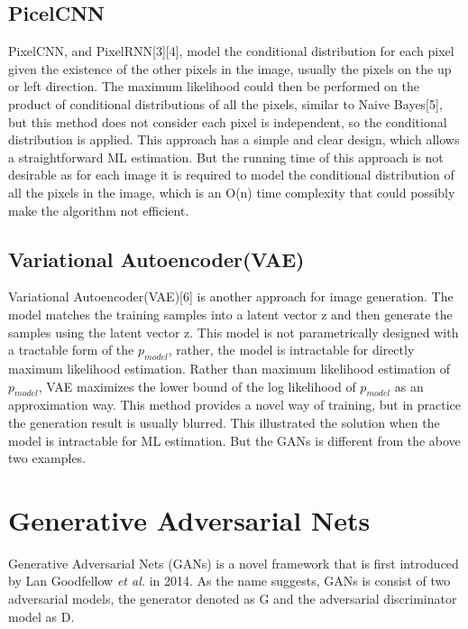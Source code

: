 \documentclass[10pt,twocolumn,letterpaper]{article}
\begin{document}
\subsection{PicelCNN}

PixelCNN, and PixelRNN[3][4], model the conditional distribution for each pixel given the existence of the other pixels in the image, usually the pixels on the up or left direction. The maximum likelihood could then be performed on the product of conditional distributions of all the pixels, similar to Naive Bayes[5], but this method does not consider each pixel is independent, so the conditional distribution is applied. This approach has a simple and clear design, which allows a straightforward ML estimation. But the running time of this approach is not desirable as for each image it is required to model the conditional distribution of all the pixels in the image, which is an O(n) time complexity that could possibly make the algorithm not efficient.


\subsection{Variational Autoencoder(VAE)}

Variational Autoencoder(VAE)[6] is another approach for image generation. The model matches the training samples into a latent vector z and then generate the samples using the latent vector z. This model is not parametrically designed with a tractable form of the $p_{model}$, rather, the model is intractable for directly maximum likelihood estimation. Rather than maximum likelihood estimation of $p_{model}$, VAE maximizes the lower bound of the log likelihood of $p_{model}$ as an approximation way. This method provides a novel way of training, but in practice the generation result is usually blurred. This illustrated the solution when the model is intractable for ML estimation. But the GANs is different from the above two examples.


\section{Generative Adversarial Nets}
Generative Adversarial Nets (GANs) is a novel framework that is first introduced by Lan Goodfellow \textit{et al.} in 2014. As the name suggests, GANs is consist of two adversarial models, the generator denoted as G and the adversarial discriminator model as D.\\
\end{document}
